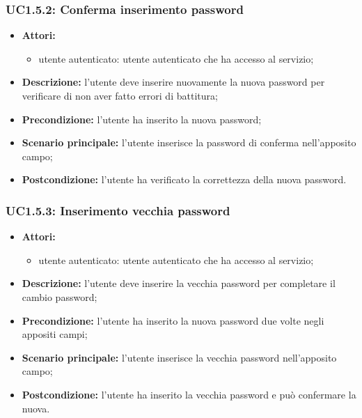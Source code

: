 \subsubsection{UC1.5.2: Conferma inserimento password }
\begin{itemize}
	\item \textbf{Attori:}
	\begin{itemize}
		\item utente autenticato: utente autenticato che ha accesso al servizio;
	\end{itemize}
	\item \textbf{Descrizione:} l'utente deve inserire nuovamente la nuova password per verificare di non aver fatto errori di battitura;
	\item \textbf{Precondizione:} l'utente ha inserito la nuova password;
	\item \textbf{Scenario principale:} l'utente inserisce la password di conferma nell'apposito campo;
	\item \textbf{Postcondizione:} l'utente ha verificato la correttezza della nuova password.
\end{itemize}

\subsubsection{UC1.5.3: Inserimento vecchia password}
\begin{itemize}
	\item \textbf{Attori:}
	\begin{itemize}
		\item utente autenticato: utente autenticato che ha accesso al servizio;
	\end{itemize}
	\item \textbf{Descrizione:} l'utente deve inserire la vecchia password per completare il cambio password;
	\item \textbf{Precondizione:} l'utente ha inserito la nuova password due volte negli appositi campi;
	\item \textbf{Scenario principale:} l'utente inserisce la vecchia password nell'apposito campo;
	\item \textbf{Postcondizione:} l'utente ha inserito la vecchia password e può confermare la nuova.
\end{itemize}

